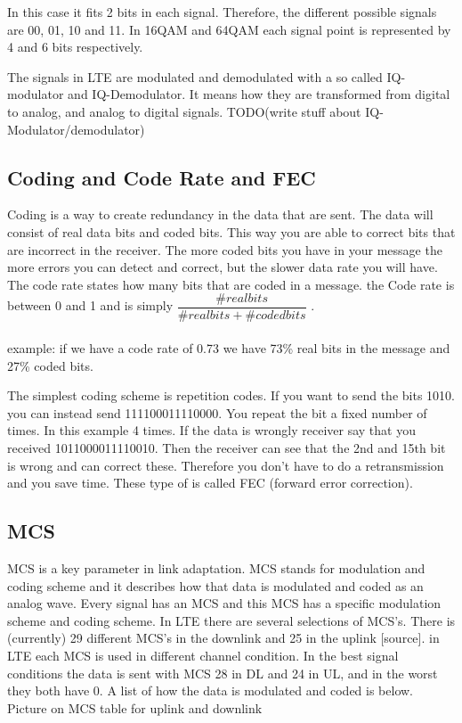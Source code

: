 \documentclass[cropmarks, frame, english]{idamasterthesis}
\begin{document}
In this case it fits 2 bits in each signal. Therefore, the different possible signals are 00, 01, 10 and 11. In 16QAM and 64QAM each signal point is represented by 4 and 6 bits respectively.

The signals in LTE are modulated and demodulated with a so called IQ-modulator and IQ-Demodulator. It means how they are transformed from digital to analog, and analog to digital signals.
TODO(write stuff about IQ-Modulator/demodulator)

\subsection{Coding and Code Rate and FEC}
Coding is a way to create redundancy in the data that are sent. The data will consist of real data bits and coded bits. This way you are able to correct bits that are incorrect in the receiver. The more coded bits you have in your message the more errors you can detect and correct, but the slower data rate you will have. The code rate states how many bits that are coded in a message. the Code rate is between 0 and 1 and is simply $\dfrac{\# real bits}{ \# real bits + \# coded bits}$ .
\\ \\
example: if we have a code rate of 0.73 we have 73\% real bits in the message and 27\% coded bits.

The simplest coding scheme is repetition codes. If you want to send the bits 1010. you can instead send 111100011110000. You repeat the bit a fixed number of times. In this example 4 times. If the data is wrongly receiver say that you received 1011000011110010. Then the receiver can see that the 2nd and 15th bit is wrong and can correct these. Therefore you don't have to do a retransmission and you save time. These type of  is called FEC (forward error correction).

\subsection{MCS}
MCS is a key parameter in link adaptation. MCS stands for modulation and coding scheme and it describes how that data is modulated and coded as an analog wave. Every signal has an MCS and this MCS has a specific modulation scheme and coding scheme. In LTE there are several selections of MCS's. There is (currently) 29 different MCS's in the downlink and 25 in the uplink [source]. in LTE each MCS is used in different channel condition. In the best signal conditions the data is sent with MCS 28 in DL and 24 in UL, and in the worst they both have 0. A list of how the data is modulated and coded is below.
\\
Picture on MCS table for uplink and downlink
\end{document}
